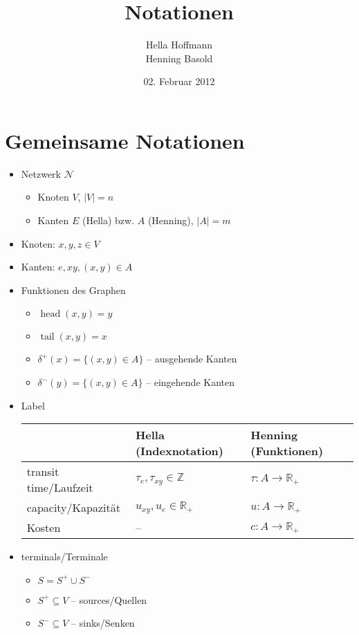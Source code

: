 \documentclass[12pt, a4paper]{article}
\title{Notationen}
\author{Hella Hoffmann \\ Henning Basold}
\date{02. Februar 2012}
\newcommand{\Z}{\mathbb{Z}}
\newcommand{\R}{\mathbb{R}}
\newcommand{\func}[3]{\ensuremath{{#1} \colon {#2} \to {#3}}}
\newcommand{\graph}{\mathcal{N}}
\newcommand{\outEdges}{\delta^+}
\newcommand{\inEdges}{\delta^-}
\DeclareMathOperator{\head}{head}
\DeclareMathOperator{\tail}{tail}
\begin{document}
\maketitle

\section*{Gemeinsame Notationen}

\begin{itemize}
    \item Netzwerk $\graph$
        \begin{itemize}
            \item Knoten $V$, $|V| = n$
            \item Kanten $E$ (Hella) bzw. $A$ (Henning), $|A| = m$
        \end{itemize}
    \item Knoten: $x, y, z \in V$
    \item Kanten: $e, xy, (x,y) \in A$
    \item Funktionen des Graphen
        \begin{itemize}
            \item $\head(x,y) = y$
            \item $\tail(x,y) = x$
            \item $\outEdges(x) = \{(x,y) \in A\}$ -- ausgehende Kanten
            \item $\inEdges(y) = \{(x,y) \in A\}$ -- eingehende Kanten
        \end{itemize}
    \item Label \\
    	\begin{tabular}{l|l|l}
    	    & Hella (Indexnotation) & Henning (Funktionen) \\ \hline
            transit time/Laufzeit & $\tau_e, \tau_{xy} \in \Z$ & $\func{\tau}{A}{\R_+}$ \\
            capacity/Kapazität & $u_{xy}, u_e \in \R_+$ & $\func{u}{A}{\R_+}$ \\
            Kosten & -- & $\func{c}{A}{\R_+}$ \\
    	\end{tabular}
	\item terminals/Terminale
	    \begin{itemize}
	        \item $S = S^+ \cup S^-$
	        \item $S^+ \subseteq V$ -- sources/Quellen
	        \item $S^- \subseteq V$ -- sinks/Senken

\end{itemize}
\end{itemize}
\end{document}
